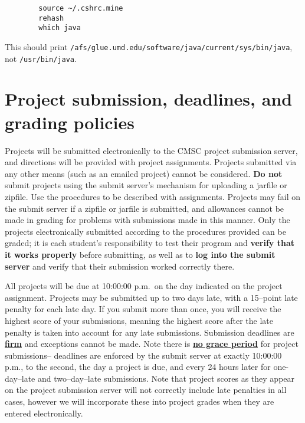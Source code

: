 \documentclass[10pt]{article}
\begin{document}
\begin{enumerate}
            \begin{centering}

              \begin{BVerbatim}
        source ~/.cshrc.mine
        rehash
        which java
              \end{BVerbatim}

            \end{centering}

            \medskip

            This should print
            \texttt{/afs/glue.umd.edu/software/java/current/sys/bin/java},
            not \texttt{/usr/bin/java}.

    \end{enumerate}

    \vspace{-1.75mm}

  \section{Project submission, deadlines, and grading policies}

    Projects will be submitted electronically to the CMSC project submission
  server, and directions will be provided with project assignments.
  Projects submitted via any other means (such as an emailed project) cannot
  be considered.  \textbf{Do not} submit projects using the submit server's
  mechanism for uploading a jarfile or zipfile.  Use the procedures to be
  described with assignments.  Projects may fail on the submit server if a
  zipfile or jarfile is submitted, and allowances cannot be made in grading
  for problems with submissions made in this manner.  Only the projects
  electronically submitted according to the procedures provided can be
  graded; it is each student's responsibility to test their program and
  \textbf{verify that it works properly} before submitting, as well as to
  \textbf{log into the submit server} and verify that their submission
  worked correctly there.

    All projects will be due at 10:00:00 p.m.\ on the day indicated on the
  project assignment.  Projects may be submitted up to two days late, with a
  15--point late penalty for each late day.  If you submit more than once,
  you will receive the highest score of your submissions, meaning the
  highest score after the late penalty is taken into account for any late
  submissions.  Submission deadlines are \textbf{\underline{firm}} and
  exceptions cannot be made.  Note there is \underline{\textbf{no grace
  period}} for project submissions-- deadlines are enforced by the
  submit server at exactly 10:00:00 p.m., to the second, the day a project
  is due, and every 24 hours later for one-day--late and two--day--late
  submissions.  Note that project scores as they appear on the project
  submission server will not correctly include late penalties in all cases,
  however we will incorporate these into project grades when they are
  entered electronically.
\end{document}
